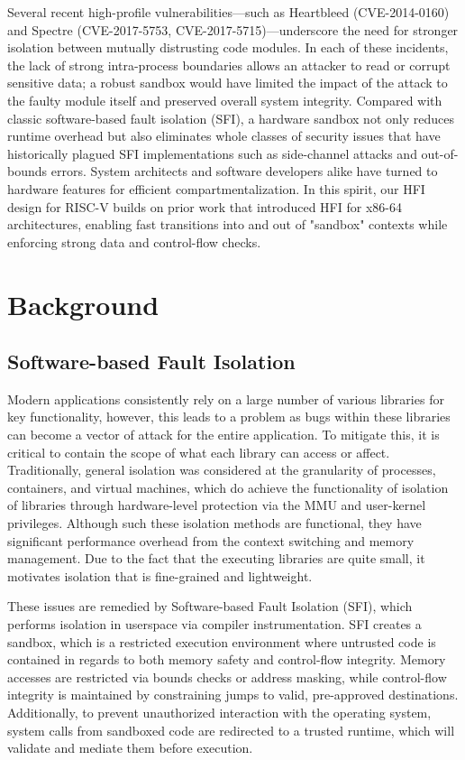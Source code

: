 \documentclass[conference,compsoc]{IEEEtran}
\begin{document}
Several recent high-profile vulnerabilities—such as Heartbleed (CVE-2014-0160) and Spectre (CVE-2017-5753, CVE-2017-5715)—underscore the need for stronger isolation between mutually distrusting code modules. In each of these incidents, the lack of strong intra-process boundaries allows an attacker to read or corrupt sensitive data; a robust sandbox would have limited the impact of the attack to the faulty module itself and preserved overall system integrity. Compared with classic software-based fault isolation (SFI), a hardware sandbox not only reduces runtime overhead but also eliminates whole classes of security issues that have historically plagued SFI implementations such as side-channel attacks and out-of-bounds errors. System architects and software developers alike have turned to hardware features for efficient compartmentalization. In this spirit, our HFI design for RISC-V builds on prior work that introduced HFI for x86-64 architectures, enabling fast transitions into and out of "sandbox" contexts while enforcing strong data and control-flow checks.

\section{Background}
\subsection{Software-based Fault Isolation}
Modern applications consistently rely on a large number of various libraries for key functionality, however, this leads to a problem as bugs within these libraries can become a vector of attack for the entire application.
To mitigate this, it is critical to contain the scope of what each library can access or affect.
Traditionally, general isolation was considered at the granularity of processes, containers, and virtual machines, which do achieve the functionality of isolation of libraries through hardware-level protection via the MMU and user-kernel privileges.
Although such these isolation methods are functional, they have significant performance overhead from the context switching and memory management. 
Due to the fact that the executing libraries are quite small, it motivates isolation that is fine-grained and lightweight.

These issues are remedied by Software-based Fault Isolation (SFI), which performs isolation in userspace via compiler instrumentation.
SFI creates a sandbox, which is a restricted execution environment where untrusted code is contained in regards to both memory safety and control-flow integrity.
Memory accesses are restricted via bounds checks or address masking, while control-flow integrity is maintained by constraining jumps to valid, pre-approved destinations.
Additionally, to prevent unauthorized interaction with the operating system, system calls from sandboxed code are redirected to a trusted runtime, which will validate and mediate them before execution.
\end{document}
